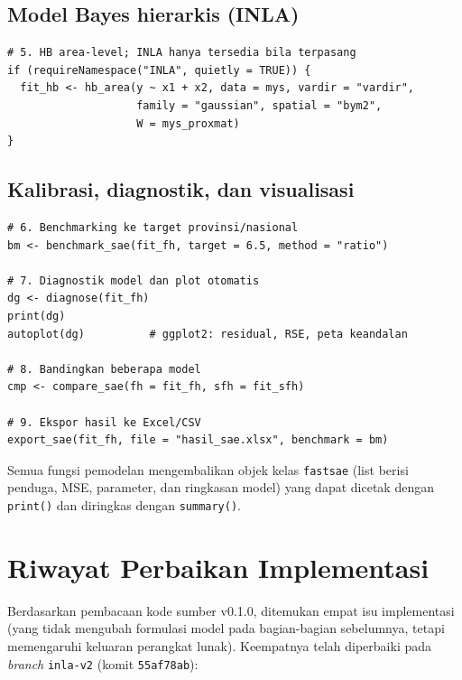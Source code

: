 \documentclass[11pt,a4paper]{article}
\theoremstyle{definition}
\begin{document}
\subsection{Model Bayes hierarkis (INLA)}

\begin{verbatim}
# 5. HB area-level; INLA hanya tersedia bila terpasang
if (requireNamespace("INLA", quietly = TRUE)) {
  fit_hb <- hb_area(y ~ x1 + x2, data = mys, vardir = "vardir",
                    family = "gaussian", spatial = "bym2",
                    W = mys_proxmat)
}
\end{verbatim}

\subsection{Kalibrasi, diagnostik, dan visualisasi}

\begin{verbatim}
# 6. Benchmarking ke target provinsi/nasional
bm <- benchmark_sae(fit_fh, target = 6.5, method = "ratio")

# 7. Diagnostik model dan plot otomatis
dg <- diagnose(fit_fh)
print(dg)
autoplot(dg)          # ggplot2: residual, RSE, peta keandalan

# 8. Bandingkan beberapa model
cmp <- compare_sae(fh = fit_fh, sfh = fit_sfh)

# 9. Ekspor hasil ke Excel/CSV
export_sae(fit_fh, file = "hasil_sae.xlsx", benchmark = bm)
\end{verbatim}

Semua fungsi pemodelan mengembalikan objek kelas \texttt{fastsae} (list berisi
penduga, MSE, parameter, dan ringkasan model) yang dapat dicetak dengan
\texttt{print()} dan diringkas dengan \texttt{summary()}.

\appendix
\section{Riwayat Perbaikan Implementasi}

Berdasarkan pembacaan kode sumber v0.1.0, ditemukan empat isu implementasi
(yang tidak mengubah formulasi model pada bagian-bagian sebelumnya, tetapi
memengaruhi keluaran perangkat lunak). Keempatnya telah diperbaiki pada
\textit{branch} \texttt{inla-v2} (komit \texttt{55af78ab}):
\end{document}
